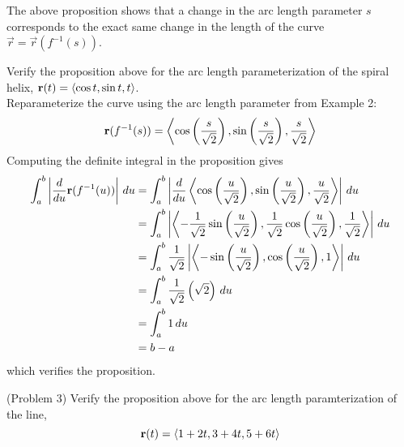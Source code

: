 \documentclass[handout]{ximera}
\begin{document}
\begin{remark}
The above proposition shows that a change in the arc length parameter $s$ corresponds to the exact same change in the length of the curve $\vec r = \vec r(f^{-1}(s))$.
\end{remark}





\begin{example}[Example 3]
Verify the proposition above for the arc length parameterization of the spiral helix, $\mathbf r(t) = \left\langle \cos t, \sin t, t\right\rangle$.\\ 
Reparameterize the curve using the arc length parameter from Example 2:
\[
\mathbf r(f^{-1}(s)) = \left\langle \cos \left(\frac{s}{\sqrt 2}\right), \sin \left(\frac{s}{\sqrt 2}\right),\frac{s}{\sqrt 2}\right\rangle
\]
Computing the definite integral in the proposition gives
\begin{align*}
\int_a^b \left| \frac{d}{du} \mathbf r(f^{-1}(u))\right| \, du &= \int_a^b \left| \frac{d}{du} \left\langle \cos \left(\frac{u}{\sqrt 2}\right), \sin \left(\frac{u}{\sqrt 2}\right),\frac{u}{\sqrt 2}\right\rangle\right|\, du\\
&= \int_a^b \left| \left\langle  -\frac{1}{\sqrt 2} \sin\left(\frac{u}{\sqrt 2}\right), \frac{1}{\sqrt 2} \cos\left(\frac{u}{\sqrt 2}\right), \frac{1}{\sqrt 2}\right\rangle\right|\, du\\
&= \int_a^b \frac{1}{\sqrt 2} \left|\left\langle -\sin\left(\frac{u}{\sqrt 2}\right),\cos\left(\frac{u}{\sqrt 2}\right),1\right\rangle \right|\, du\\
&= \int_a^b \frac{1}{\sqrt 2} \left(\sqrt 2\right) \, du\\
&= \int_a^b 1 \, du\\
&= b - a
\end{align*}
which verifies the proposition.
\end{example}

\begin{problem}(Problem 3)
Verify the proposition above for the arc length paramterization of the line, 
\[
\mathbf r(t) = \left\langle 1 + 2t, 3+4t, 5+6t\right\rangle
\]
\end{problem}
\end{document}
